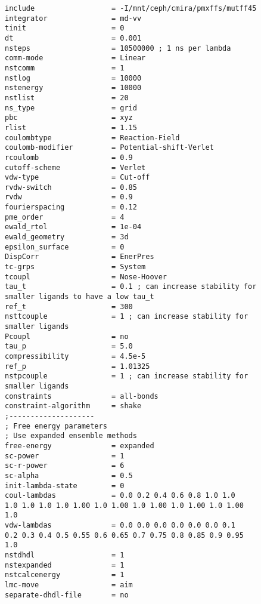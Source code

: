 \begin{lstlisting}
include                  = -I/mnt/ceph/cmira/pmxffs/mutff45
integrator               = md-vv
tinit                    = 0
dt                       = 0.001
nsteps                   = 10500000 ; 1 ns per lambda
comm-mode                = Linear
nstcomm                  = 1
nstlog                   = 10000
nstenergy                = 10000
nstlist                  = 20
ns_type                  = grid
pbc                      = xyz
rlist                    = 1.15
coulombtype              = Reaction-Field
coulomb-modifier         = Potential-shift-Verlet
rcoulomb                 = 0.9
cutoff-scheme            = Verlet
vdw-type                 = Cut-off
rvdw-switch              = 0.85
rvdw                     = 0.9
fourierspacing           = 0.12
pme_order                = 4
ewald_rtol               = 1e-04
ewald_geometry           = 3d
epsilon_surface          = 0
DispCorr                 = EnerPres
tc-grps                  = System
tcoupl                   = Nose-Hoover
tau_t                    = 0.1 ; can increase stability for
smaller ligands to have a low tau_t 
ref_t                    = 300
nsttcouple               = 1 ; can increase stability for
smaller ligands 
Pcoupl                   = no
tau_p                    = 5.0
compressibility          = 4.5e-5
ref_p                    = 1.01325
nstpcouple               = 1 ; can increase stability for
smaller ligands  
constraints              = all-bonds
constraint-algorithm     = shake    
;--------------------
; Free energy parameters
; Use expanded ensemble methods
free-energy              = expanded
sc-power                 = 1  
sc-r-power               = 6
sc-alpha                 = 0.5
init-lambda-state        = 0  
coul-lambdas             = 0.0 0.2 0.4 0.6 0.8 1.0 1.0
1.0 1.0 1.0 1.0 1.00 1.0 1.00 1.0 1.00 1.0 1.00 1.0 1.00
1.0
vdw-lambdas              = 0.0 0.0 0.0 0.0 0.0 0.0 0.1
0.2 0.3 0.4 0.5 0.55 0.6 0.65 0.7 0.75 0.8 0.85 0.9 0.95
1.0
nstdhdl                  = 1
nstexpanded              = 1
nstcalcenergy            = 1 
lmc-move                 = aim
separate-dhdl-file       = no
\end{lstlisting}